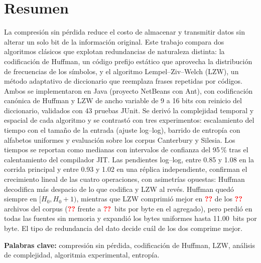 \documentclass[11pt,a4paper]{article}
\newcommand{\resmissing}{\textcolor{red}{\textbf{??}}}
\providecommand{\resCorpusFiles}{\resmissing}
\providecommand{\resLzwWins}{\resmissing}
\providecommand{\resCorpusHuffBpb}{\resmissing}
\providecommand{\resCorpusLzwBpb}{\resmissing}
\begin{document}

\section*{Resumen}
La compresión sin pérdida reduce el costo de almacenar y transmitir datos sin alterar un
solo bit de la información original. Este trabajo compara dos algoritmos clásicos que
explotan redundancias de naturaleza distinta: la codificación de Huffman, un código prefijo
estático que aprovecha la distribución de frecuencias de los símbolos, y el algoritmo
Lempel--Ziv--Welch (LZW), un método adaptativo de diccionario que reemplaza frases
repetidas por códigos. Ambos se implementaron en Java (proyecto NetBeans con Ant), con
codificación canónica de Huffman y LZW de ancho variable de 9 a 16 bits con reinicio del
diccionario, validados con 43 pruebas JUnit. Se derivó la complejidad temporal y espacial de
cada algoritmo y se contrastó con tres experimentos: escalamiento del tiempo con el tamaño
de la entrada (ajuste log--log), barrido de entropía con alfabetos uniformes y evaluación sobre
los corpus Canterbury y Silesia. Los tiempos se reportan como medianas con intervalos de confianza del
95\,\% tras el calentamiento del compilador JIT.
Las pendientes log--log, entre 0.85 y 1.08 en la corrida principal y entre 0.93 y 1.02 en una
réplica independiente, confirman el crecimiento lineal de las cuatro operaciones, con
asimetrías opuestas: Huffman decodifica más despacio de lo que codifica y LZW al revés. Huffman
quedó siempre en $[H_0, H_0 + 1)$, mientras que LZW comprimió mejor en \resLzwWins{} de los
\resCorpusFiles{} archivos del corpus (\resCorpusLzwBpb{} frente a \resCorpusHuffBpb{}~bits
por byte en el agregado), pero perdió en todas las fuentes sin memoria y expandió los bytes
uniformes hasta 11.00~bits por byte. El tipo de redundancia del dato decide cuál
de los dos comprime mejor.

\medskip\noindent\textbf{Palabras clave:} compresión sin pérdida, codificación de Huffman,
LZW, análisis de complejidad, algoritmia experimental, entropía.
\end{document}
